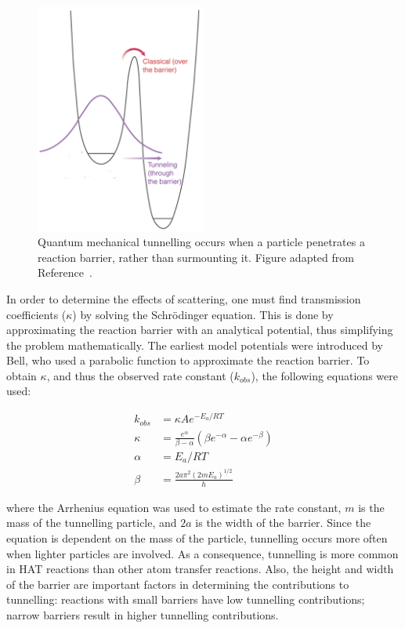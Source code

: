 \begin{figure}[htb]
  \centering
  \includegraphics[width=0.5\textwidth]{figures/tunnelling-1}
  \caption{Quantum mechanical tunnelling occurs when a particle penetrates a
    reaction barrier, rather than surmounting it. Figure adapted from Reference~.}
\label{fig:tunnelling}
\end{figure}


In order to determine the effects of scattering, one must find transmission coefficients ($\kappa$) by solving the Schr{\"o}dinger equation.\cite{Griffiths2016} This is done by approximating the reaction barrier with an analytical potential, thus simplifying the problem mathematically. The earliest model potentials were introduced by Bell, who used a parabolic function to approximate the reaction barrier.\cite{Bell1980} To obtain $\kappa$, and thus the observed rate constant ($k_{obs}$), the following equations were used:

\begin{align}
  k_{obs} &= \kappa A e^{-E_a/RT}  \\
\kappa &= \frac{e^\alpha}{\beta-\alpha} \left(\beta e^{-\alpha} - \alpha
  e^{-\beta} \right) \\
  \alpha &= E_a/RT \\
  \beta &= \frac{2a\pi^2(2mE_a)^{1/2}}{h}
\end{align}

\noindent where the Arrhenius equation was used to estimate the rate constant, $m$ is the mass of the tunnelling particle, and $2a$ is the width of the barrier. Since the equation is dependent on the mass of the particle, tunnelling occurs more often when lighter particles are involved. As a consequence, tunnelling is more common in HAT reactions than other atom transfer reactions. Also, the height and width of the barrier are important factors in determining the contributions to tunnelling: reactions with small barriers have low tunnelling contributions; narrow barriers result in higher tunnelling contributions.

